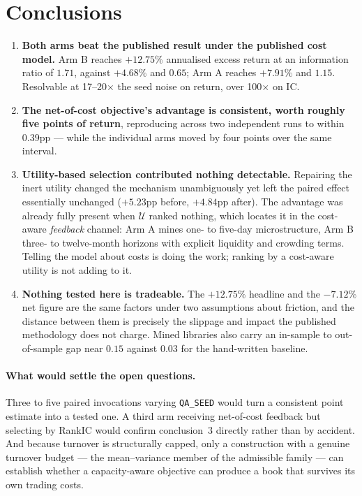 \documentclass[11pt,a4paper]{article}
\newcommand{\util}{\mathcal{U}}
\begin{document}
\section{Conclusions}

\begin{enumerate}\itemsep3pt\parskip0pt
  \item \textbf{Both arms beat the published result under the published cost
        model.} Arm B reaches $+12.75\%$ annualised excess return at an
        information ratio of $1.71$, against $+4.68\%$ and $0.65$; Arm A reaches
        $+7.91\%$ and $1.15$. Resolvable at 17--20$\times$ the seed noise on
        return, over 100$\times$ on IC.

  \item \textbf{The net-of-cost objective's advantage is consistent, worth
        roughly five points of return}, reproducing across two independent runs
        to within $0.39$pp --- while the individual arms moved by four points
        over the same interval.

  \item \textbf{Utility-based selection contributed nothing detectable.}
        Repairing the inert utility changed the mechanism unambiguously yet left
        the paired effect essentially unchanged ($+5.23$pp before, $+4.84$pp
        after). The advantage was already fully present when $\util$ ranked
        nothing, which locates it in the cost-aware \emph{feedback} channel: Arm
        A mines one- to five-day microstructure, Arm B three- to twelve-month
        horizons with explicit liquidity and crowding terms. Telling the model
        about costs is doing the work; ranking by a cost-aware utility is not
        adding to it.

  \item \textbf{Nothing tested here is tradeable.} The $+12.75\%$ headline and
        the $-7.12\%$ net figure are the same factors under two assumptions
        about friction, and the distance between them is precisely the slippage
        and impact the published methodology does not charge. Mined libraries
        also carry an in-sample to out-of-sample gap near $0.15$ against $0.03$
        for the hand-written baseline.
\end{enumerate}

\paragraph{What would settle the open questions.} Three to five paired
invocations varying \texttt{QA\_SEED} would turn a consistent point estimate into
a tested one. A third arm receiving net-of-cost feedback but selecting by RankIC
would confirm conclusion~3 directly rather than by accident. And because turnover
is structurally capped, only a construction with a genuine turnover budget --- the
mean--variance member of the admissible family --- can establish whether a
capacity-aware objective can produce a book that survives its own trading costs.
\end{document}
